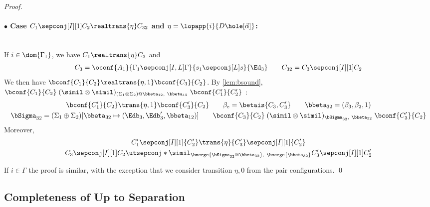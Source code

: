 \begin{proof}
  \paragraph{$\bullet$ Case
  $C_1 \sepconj[I][1] C_2 \realtrans{\eta} C_{32}$
  and
  $\eta=\lopapp{i}{D\hole[\vec \alpha]}$:}~\\
  If $i\in\dom{\Gamma_1}$, we have
  $C_1 \realtrans{\eta} C_3$ and
  \begin{gather*}
    C_3 = \oconf{A_1}{\Gamma_1\sepconj[I,L]\Gamma}{s_1\sepconj[L] s}{\Ed_3}
    \qquad
    C_{32} = C_3\sepconj[I][1] C_2
  \end{gather*}
  We then have
  $
    \bconf{C_1}{C_2} \realtrans{\eta,1} \bconf{C_3}{C_2}
  $.
  By \cref{lem:bsound}, $\bconf{C_1}{C_2} \mathrel{(\simil \otimes \simil)_{(\Sigma_1\otimes\Sigma_2)@\bbeta_{12},~\bbeta_{12}}} \bconf{C_1'}{C_2'}$ :
  \begin{gather*}
    \bconf{C_1'}{C_2} \trans{\eta,1} \bconf{C_3'}{C_2}
    \qquad
    \beta_e = \betais{C_3, C_3'}
    \qquad
    \bbeta_{32}=(\beta_3,\beta_2, 1)
    \\
    \bSigma_{32} = (\Sigma_1\oplus\Sigma_2)[\bbeta_{32} \mapsto (\Edb_3,\Edb_3',\bbeta_{12})]
    \qquad
    \bconf{C_3}{C_2}
    \mathrel{(\simil \otimes \simil)_{\bSigma_{32},~\bbeta_{32}}}
    \bconf{C_3'}{C_2}
  \end{gather*}
  Moreover,
  \begin{gather*}
    {C_1'}\sepconj[I][1]{C_2'} \trans{\eta} {C_3'}\sepconj[I][1]{C_2'}
    \\
    C_3 \sepconj[I][1] C_2
    \utsepconj*{\simil}_{\bmerge{\bSigma_{32}@\bbeta_{32}},~\bmerge{\bbeta_{32}}}
    C_3' \sepconj[I][1] C_2'
  \end{gather*}

  If $i\in\Gamma$ the proof is similar, with the exception that we consider transition $\eta,0$ from the pair configurations.
\qed\end{proof}

\subsection{Completeness of Up to Separation}
\label{appx:uptosep-complete}

